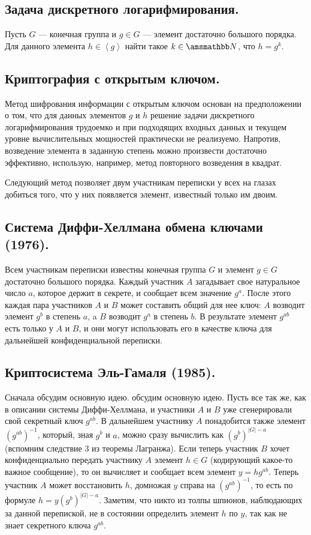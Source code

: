 \subsection{Задача дискретного логарифмирования.}
Пусть $G$ --- конечная группа и $g \in G$ --- элемент 
достаточно большого порядка. Для данного элемента $h \in \left< g \right>$
найти такое $k \in \NN$, что $h = g^{k}$.

\subsection{Криптография с открытым ключом.}
Метод шифрования информации с открытым ключом основан на предположении 
о том, что для данных элементов $g$ и $h$ решение задачи дискретного
логарифмирования трудоемко и при подходящих входных данных и текущем уровне
вычислительных мощностей практически не реализуемо. Напротив, возведение
элемента в заданную степень можно произвести достаточно эффективно,
использую, например, метод повторного возведения в квадрат.

Следующий метод позволяет двум участникам переписки у всех на глазах добиться
того, что у них появляется элемент, известный только им двоим.

\subsection{Система Диффи-Хеллмана обмена ключами (1976).}

Всем участникам переписки известны конечная группа $G$ и элемент $g \in G$
достаточно большого порядка. Каждый участник $A$ загадывает
свое натуральное число $a$, которое держит в секрете, и сообщает всем
значение $g^{a}$. После этого каждая пара
участников $A$ и $B$ может составить общий для нее ключ:
$A$ возводит элемент $g^{b}$ в степень $a$, a $B$ возводит
$g^{a}$ в степень $b$. В результате элемент $g^{ab}$ есть только у
$A$ и $B$, и они могут использовать его в качестве ключа для дальнейшей
конфиденциальной переписки.

\subsection{Криптосистема Эль-Гамаля (1985).}

Сначала обсудим основную идею. обсудим основную идею. 
Пусть все так же, как в описании системы Диффи-Хеллмана,
и участники $A$ и $B$ уже сгенерировали свой секретный ключ $g^{ab}$.
В дальнейшем участнику $A$ понадобится также элемент $(g^{ab})^{-1}$,
который, зная $g^b$ и $a$, можно сразу вычислить как $(g^{b})^{|G| - a}$
(вспомним следствие 3 из теоремы Лагранжа). Если теперь участник $B$ хочет
конфиденциально передать участнику $A$ элемент $h \in G$
(кодирующий какое-то важное сообщение), то он вычисляет и сообщает всем
элемент $y = hg^{ab}$. Теперь участник $A$ может восстановить $h$, домножая
$y$ справа на $\left(g^{ab}\right)^{-1}$, 
то есть по формуле $h = y\left(g^{b}\right)^{|G| - a}$.
Заметим, что никто из толпы шпионов, наблюдающих за данной перепиской,
не в состоянии определить элемент $h$ по $y$, так как не знает секретного ключа
$g^{ab}$.

